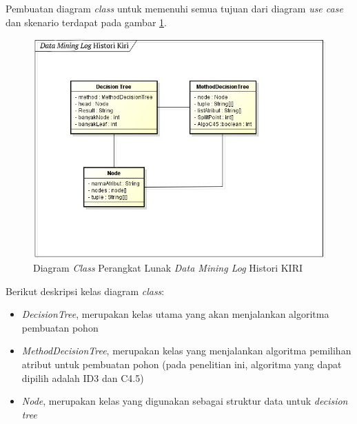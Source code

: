 Pembuatan diagram \textsl{class} untuk memenuhi semua tujuan dari diagram \textsl{use case} dan skenario terdapat pada gambar \ref{fig:classDiagram}.

\begin{figure}[h]
\includegraphics[scale=0.8]{Gambar/classdiagram.jpg}
\caption[Diagram \textsl{Class} Perangkat Lunak \textsl{Data Mining Log} Histori KIRI]{Diagram \textsl{Class} Perangkat Lunak \textsl{Data Mining Log} Histori KIRI} 
\label{fig:classDiagram}
\end{figure}

Berikut deskripsi kelas diagram \textsl{class}:
\begin{itemize}
	\item \textsl{DecisionTree}, merupakan kelas utama yang akan menjalankan algoritma pembuatan pohon
	\item \textsl{MethodDecisionTree}, merupakan kelas yang menjalankan algoritma pemilihan atribut untuk pembuatan pohon (pada penelitian ini, algoritma yang dapat dipilih adalah ID3 dan C4.5)
	\item \textsl{Node}, merupakan kelas yang digunakan sebagai struktur data untuk \textsl{decision tree}
\end{itemize}
	
















